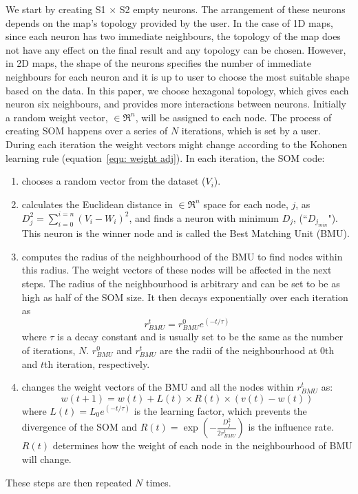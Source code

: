      We start by creating S1 $\times$ S2 empty neurons. 
     The arrangement of these neurons depends on the map's topology provided by the user. %
     In the case of 1D maps, since each neuron has two immediate neighbours, the topology of the map does not have any effect on the final result and any topology can be chosen.
     However, in 2D maps, the shape of the neurons specifies the number of immediate neighbours for each neuron and it is up to user to choose the most suitable shape based on the data.
     In this paper, we choose hexagonal topology, which gives each neuron six neighbours, and provides more interactions between neurons.
     Initially a random weight vector,  $\in \Re^n$, will be assigned to each node.
     The process of creating SOM happens over a series of $N$ iterations, which is set by a user. %
     During each iteration the weight vectors might change according to the Kohonen learning rule (equation~\ref{equ: weight adj}). 
      In each iteration, the SOM code:
     \begin{enumerate}
        \item chooses a random vector from the dataset ($V_i$).
        \item calculates the Euclidean distance in $\in \Re^n$ space for each node, $j$, as  $D_j^2= \sum_{i=0}^{i=n} (V_i - W_i)^2$, and finds a neuron with minimum $D_j$, (``$D_{j_{min}}$"). This neuron is the winner node and is called the Best Matching Unit (BMU). %
        \item  computes the radius of the neighbourhood of the BMU to find nodes within this radius. The weight vectors of these nodes will be affected in the next steps. The radius of the neighbourhood is arbitrary and can be set to be as high as half of the SOM size. It then decays exponentially over each iteration as
        \begin{equation}
            r^t_{BMU} = r^0_{BMU}e^{(-t/\tau)}
        \end{equation}
        where $\tau$ is a decay constant and is usually set to be the same as the number of iterations, $N$. $r^0_{BMU}$ and $r^t_{BMU}$ are the radii of the neighbourhood at 0th and $t$th iteration, respectively. 
        \item changes the weight vectors of the BMU and all the nodes within $r^t_{BMU}$ as:
        \begin{equation}
            \label{equ: weight adj}
            w(t+1)=w(t)+L(t) \times R(t) \times(v(t)-w(t))
        \end{equation}
        where $L(t) = L_0 e^{(-t/\tau)}$ is the learning factor, which prevents the divergence of the SOM and $R(t)=\exp(-\frac{D_j^2}{2r^t_{BMU}})$ is the influence rate. $R(t)$ determines how the weight of each node in the neighbourhood of BMU will change.
     \end{enumerate}
     These steps are then repeated $N$ times.
     
